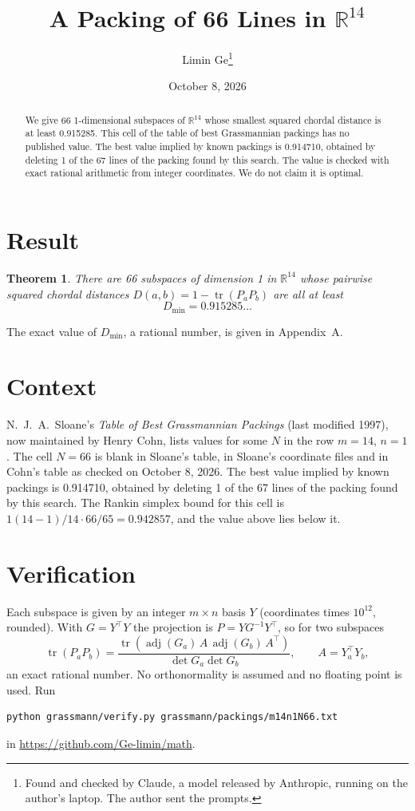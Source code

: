 \documentclass[11pt,a4paper]{article}
\title{A Packing of 66 Lines in $\mathbb{R}^{14}$}
\author{Limin Ge\thanks{Found and checked by Claude, a model released by Anthropic, running on the author's laptop. The author sent the prompts.}}
\date{October 8, 2026}
\newtheorem*{theorem}{Theorem}
\begin{document}
\maketitle
\begin{abstract}
We give 66 1-dimensional subspaces of $\mathbb{R}^{14}$ whose smallest squared chordal distance is at least 0.915285. This cell of the table of best Grassmannian packings has no published value. The best value implied by known packings is 0.914710, obtained by deleting 1 of the 67 lines of the packing found by this search. The value is checked with exact rational arithmetic from integer coordinates. We do not claim it is optimal.
\end{abstract}

\section{Result}
\begin{theorem}
There are 66 subspaces of dimension 1 in $\mathbb{R}^{14}$ whose pairwise squared chordal distances $D(a,b) = 1 - \operatorname{tr}(P_aP_b)$ are all at least
\[ D_{\min} = 0.915285\ldots \]
\end{theorem}
The exact value of $D_{\min}$, a rational number, is given in Appendix~A.


\section{Context}
N.~J.~A.~Sloane's \emph{Table of Best Grassmannian Packings} (last modified 1997), now maintained by Henry Cohn, lists values for some $N$ in the row $m=14$, $n=1$. The cell $N=66$ is blank in Sloane's table, in Sloane's coordinate files and in Cohn's table as checked on October 8, 2026. The best value implied by known packings is 0.914710, obtained by deleting 1 of the 67 lines of the packing found by this search. The Rankin simplex bound for this cell is $1(14-1)/14\cdot 66/65 = 0.942857$, and the value above lies below it.


\section{Verification}
Each subspace is given by an integer $m\times n$ basis $Y$ (coordinates times $10^{12}$, rounded). With $G=Y^\top Y$ the projection is $P=YG^{-1}Y^\top$, so for two subspaces
\[ \operatorname{tr}(P_aP_b)=\frac{\operatorname{tr}(\operatorname{adj}(G_a)\,A\,\operatorname{adj}(G_b)\,A^\top)}{\det G_a\det G_b},\qquad A=Y_a^\top Y_b, \]
an exact rational number. No orthonormality is assumed and no floating point is used. Run
\begin{verbatim}
python grassmann/verify.py grassmann/packings/m14n1N66.txt
\end{verbatim}
in \url{https://github.com/Ge-limin/math}.
\end{document}
